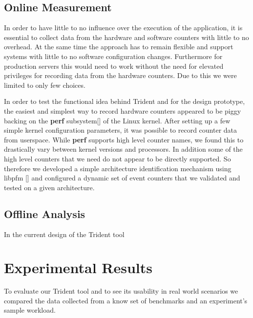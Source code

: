\documentclass{webofc}
\begin{document}
\subsection{Online Measurement}

In order to have little to no influence over the execution of the application, it is essential to collect data from the hardware and software counters with little to no overhead. At the same time the approach has to remain flexible and support systems with little to no software configuration changes. Furthermore for production servers this would need to work without the need for elevated privileges for recording data from the hardware counters. Due to this we were limited to only few choices. 

In order to test the functional idea behind Trident and for the design prototype, the easiest and simplest way to record hardware counters appeared to be piggy backing on the \textbf{perf} subsystem[] of the Linux kernel. After setting up a few simple kernel configuration parameters, it was possible to record counter data from userspace. While \textbf{perf} supports high level counter names, we found this to drastically vary between kernel versions and processors. In addition some of the high level counters that we need do not appear to be directly supported. So therefore we developed a simple architecture identification mechanism using libpfm [] and configured a dynamic set of event counters that we validated and tested on a given architecture.

\subsection{Offline Analysis}

In the current design of the Trident tool

\section{Experimental Results}

To evaluate our Trident tool and to see its usability in real world scenarios we compared the data collected from a know set of benchmarks and an experiment's sample workload. 


\end{document}
